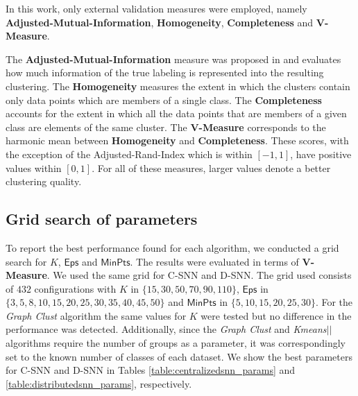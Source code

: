 \documentclass[preprint,12pt,authoryear,review]{elsarticle}
\begin{document}
In this work, only external validation measures were employed, namely \textbf{Adjusted-Mutual-Information}, \textbf{Homogeneity}, \textbf{Completeness} and  \textbf{V-Measure}. 

The \textbf{Adjusted-Mutual-Information} measure was proposed in \cite{VEB10} and evaluates how much information of the true labeling is represented into the resulting clustering. The \textbf{Homogeneity} measures the extent in which the clusters contain only data points which are members of a single class. The \textbf{Completeness} accounts for the extent in which all the data points that are members of a given class are elements of the same cluster. The \textbf{V-Measure} corresponds to the harmonic mean between \textbf{Homogeneity} and \textbf{Completeness}. These scores, with the exception of the Adjusted-Rand-Index which is within $[-1,1]$, have positive values within $[0,1]$. For all of these measures, larger values denote a better clustering quality.


\subsection*{Grid search of parameters}

To report the best performance found for each algorithm, we conducted a grid search for $K$, $\mathsf{Eps}$ and $\mathsf{MinPts}$. The results were evaluated in terms of \textbf{V-Measure}. We used the same grid for C-SNN and D-SNN.
The grid used consists of $432$ configurations with $K$ in $\{15, 30, 50, 70, 90, 110\}$, $\mathsf{Eps}$ in $\{3, 5, 8, 10, 15, 20, 25, 30, 35, 40, 45, 50\}$ and $\mathsf{MinPts}$ in $\{5, 10, 15, 20, 25, 30\}$. For the \textit{Graph Clust} algorithm the same values for $K$ were tested but no difference in the performance was detected. Additionally, since the \textit{Graph Clust} and \textit{Kmeans$||$} algorithms require the number of groups as a parameter, it was correspondingly set to the known number of classes of each dataset.
We show the best parameters for C-SNN and D-SNN in Tables \ref{table:centralizedsnn_params} and \ref{table:distributedsnn_params}, respectively.
\end{document}
